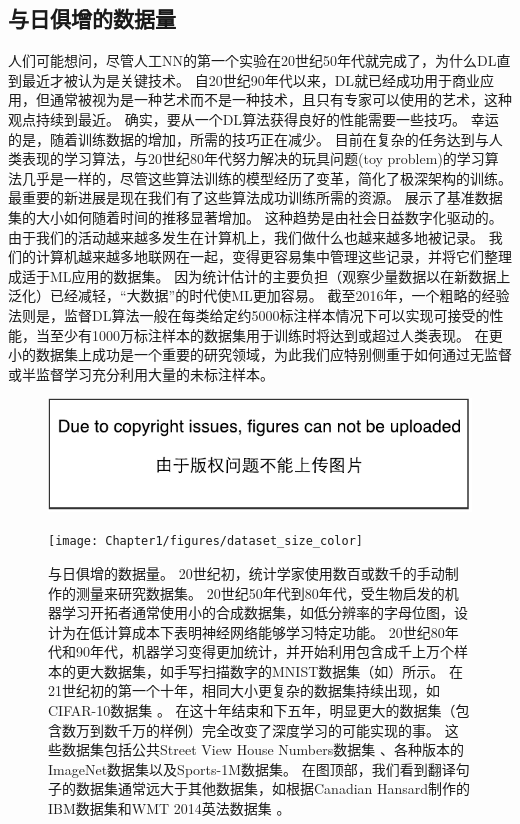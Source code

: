 \subsection{与日俱增的数据量}
\label{sec:increasing_dataset_sizes}
人们可能想问，尽管人工\gls{NN}的第一个实验在20世纪50年代就完成了，为什么\gls{DL}直到最近才被认为是关键技术。
自20世纪90年代以来，\gls{DL}就已经成功用于商业应用，但通常被视为是一种艺术而不是一种技术，且只有专家可以使用的艺术，这种观点持续到最近。
确实，要从一个\gls{DL}算法获得良好的性能需要一些技巧。
幸运的是，随着训练数据的增加，所需的技巧正在减少。
目前在复杂的任务达到与人类表现的学习算法，与20世纪80年代努力解决的玩具问题(toy problem)的学习算法几乎是一样的，尽管这些算法训练的模型经历了变革，简化了极深架构的训练。
最重要的新进展是现在我们有了这些算法成功训练所需的资源。
展示了基准数据集的大小如何随着时间的推移显著增加。
这种趋势是由社会日益数字化驱动的。
由于我们的活动越来越多发生在计算机上，我们做什么也越来越多地被记录。
我们的计算机越来越多地联网在一起，变得更容易集中管理这些记录，并将它们整理成适于\gls{ML}应用的数据集。
因为统计估计的主要负担（观察少量数据以在新数据上泛化）已经减轻，``大数据''的时代使\gls{ML}更加容易。
截至2016年，一个粗略的经验法则是，监督\gls{DL}算法一般在每类给定约5000标注样本情况下可以实现可接受的性能，当至少有1000万标注样本的数据集用于训练时将达到或超过人类表现。
在更小的数据集上成功是一个重要的研究领域，为此我们应特别侧重于如何通过无监督或半监督学习充分利用大量的未标注样本。
\begin{figure}[!htb]
\ifOpenSource
\centerline{\includegraphics{figure.pdf}}
\else
\centerline{\texttt{[image: Chapter1/figures/dataset\_size\_color]}}
\fi
\caption{与日俱增的数据量。
20世纪初，统计学家使用数百或数千的手动制作的测量来研究数据集\citep{garson:1900,student08ttest,IrisData1935,Fisher-1936}。
20世纪50年代到80年代，受生物启发的机器学习开拓者通常使用小的合成数据集，如低分辨率的字母位图，设计为在低计算成本下表明神经网络能够学习特定功能\citep{Widrow60,Rumelhart86c}。
20世纪80年代和90年代，机器学习变得更加统计，并开始利用包含成千上万个样本的更大数据集，如手写扫描数字的MNIST数据集（如）所示\citep{LeCun98-small}。
在21世纪初的第一个十年，相同大小更复杂的数据集持续出现，如CIFAR-10数据集\citep{KrizhevskyHinton2009} 。
在这十年结束和下五年，明显更大的数据集（包含数万到数千万的样例）完全改变了深度学习的可能实现的事。
这些数据集包括公共Street View House Numbers数据集 \citep{Netzer-wkshp-2011}、各种版本的ImageNet数据集\citep{imagenet_cvpr09,Deng2010,ILSVRCarxiv14}以及Sports-1M数据集\citep{KarpathyCVPR14}。
在图顶部，我们看到翻译句子的数据集通常远大于其他数据集，如根据Canadian Hansard制作的IBM数据集\citep{brown1990statistical}和WMT 2014英法数据集\citep{wmt14} 。
}
\label{fig:chap1_dataset_size_color}
\end{figure}

